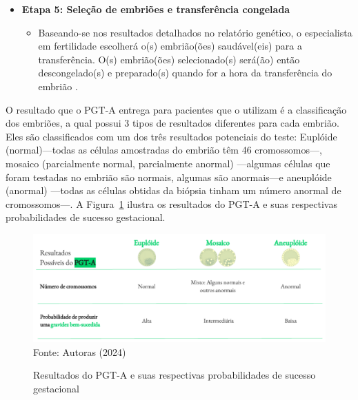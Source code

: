 \begin{itemize}
    \item \textbf{Etapa 5: Seleção de embriões e transferência congelada}
    \begin{itemize}
        \item Baseando-se nos resultados detalhados no relatório genético, o especialista em fertilidade escolherá o(s) embrião(ões) saudável(eis) para a transferência. O(s) embrião(ões) selecionado(s) será(ão) então descongelado(s) e preparado(s) quando for a hora da transferência do embrião \cite{cnyfertility2024}. 
    \end{itemize}
\end{itemize}

O resultado que o PGT-A entrega para pacientes que o utilizam é a classificação dos embriões, a qual possui 3 tipos de resultados diferentes para cada embrião. Eles são classificados com um dos três resultados potenciais do teste: Euplóide (normal)—todas as células amostradas do embrião têm 46 cromossomos—, mosaico (parcialmente normal, parcialmente anormal) —algumas células que foram testadas no embrião são normais, algumas são anormais—e aneuplóide (anormal) —todas as células obtidas da biópsia tinham um número anormal de cromossomos—\cite{cnyfertility2024}. A Figura~\ref{fig:ResultadosPGT} ilustra os resultados do PGT-A e suas respectivas probabilidades de sucesso gestacional.

\begin{center}
    \begin{figure}[h]
        \captionsetup{font=footnotesize, justification=centering, labelsep=period, position=above}
        \caption{Resultados do PGT-A e suas respectivas probabilidades de sucesso gestacional}
        \label{fig:ResultadosPGT}
        \centering
        \includegraphics[scale=0.5]{figuras/ResultadosPGT.pdf}
        \vspace{0.3cm} 
        \scriptsize{Fonte: Autoras (2024)}
    \end{figure}
\end{center}


